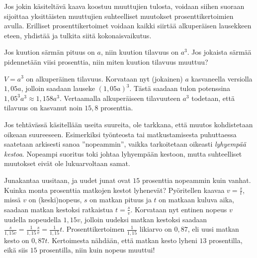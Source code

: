 Jos jokin käsiteltävä kaava koostuu muuttujien tulosta, voidaan siihen suoraan sijoittaa yksittäisten muuttujien suhteelliset muutokset prosenttikertoimien avulla. Erilliset prosenttikertoimet voidaan kaikki siirtää alkuperäisen lausekkeen eteen, yhdistää ja tulkita siitä kokonaisvaikutus.

\newpage %
\begin{esimerkki}
Jos kuution särmän pituus on $a$, niin kuution tilavuus on $a^3$. Jos jokaista särmää pidennetään viisi prosenttia, niin miten kuution tilavuus muuttuu?
	\begin{esimratk}
$V=a^3$ on alkuperäinen tilavuus. Korvataan nyt (jokainen) $a$ kasvaneella versiolla $1,05a$, jolloin saadaan lauseke $(1,05a)^3$. Tästä saadaan tulon potenssina $1,05^3a^3 \approx 1,158a^3$. Vertaamalla alkuperäiseen tilavuuteen $a^3$ todetaan, että tilavuus on kasvanut noin $15,8$ prosenttia. %
	\end{esimratk}
\end{esimerkki} %

Jos tehtävässä käsitellään useita suureita, ole tarkkana, että muutos kohdistetaan oikeaan suureeseen. Esimerkiksi työnteosta tai matkustamisesta puhuttaessa saatetaan arkisesti sanoa ''nopeammin'', vaikka tarkoitetaan oikeasti \textit{lyhyempää kestoa}. Nopeampi suoritus toki johtaa lyhyempään kestoon, mutta suhteelliset muutokset eivät ole lukuarvoltaan samat.

\begin{esimerkki}
Junakantaa uusitaan, ja uudet junat ovat $15$ prosenttia nopeammin kuin vanhat. Kuinka monta prosenttia matkojen kestot lyhenevät? Pyöritellen kaavaa $v=\frac{s}{t}$, missä $v$ on (keski)nopeus, $s$ on matkan pituus ja $t$ on matkaan kuluva aika, saadaan matkan kestoksi ratkaistua $t=\frac{s}{v}$. Korvataan nyt entinen nopeus $v$ uudella nopeudella $1,15v$, jolloin uudeksi matkan kestoksi saadaan $\frac{s}{1,15v}=\frac{1}{1,15}\frac{s}{v}=\frac{1}{1,15}t$. Prosenttikertoimen $\frac{1}{1,15}$ likiarvo on $0,87$, eli uusi matkan kesto on $0,87t$. Kertoimesta nähdään, että matkan kesto lyheni $13$ prosentilla, eikä siis $15$ prosentilla, niin kuin nopeus muuttui!
\end{esimerkki}

